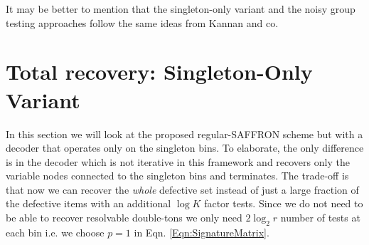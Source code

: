 \documentclass[conference,twocolumn]{IEEEtran}
\def\ceps{c_{\epsilon}}
\begin{document}
{%

\textcolor[rgb]{1.00,0.00,0.00}{It may be better to mention that the singleton-only variant and the noisy group testing approaches follow the same ideas from Kannan and co.}

\section{Total recovery: Singleton-Only Variant}
In this section we will look at the proposed regular-SAFFRON scheme but with a decoder that operates only on the singleton bins. To elaborate, the only difference is in the decoder which is not iterative in this framework and recovers only the variable nodes connected to the singleton bins and terminates. The trade-off is that now we can recover the \textit{whole} defective set instead of just a large fraction of the defective items with an additional $\log K$ factor tests. Since we do not need to be able to recover resolvable double-tons we only need $2\log_2 r$ number of tests at each bin i.e. we choose $p=1$ in Eqn. \eqref{Eqn:SignatureMatrix}.

}
\end{document}
